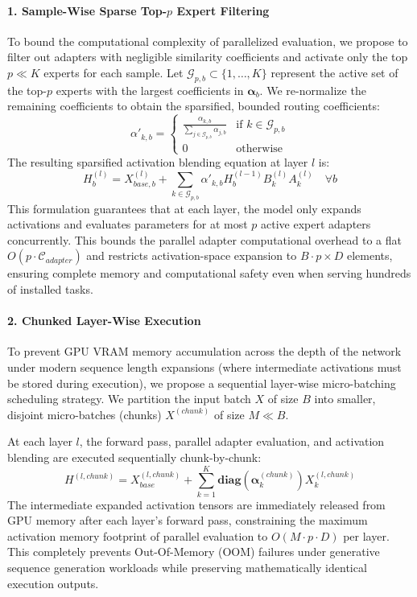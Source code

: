 \paragraph{1. Sample-Wise Sparse Top-$p$ Expert Filtering}
To bound the computational complexity of parallelized evaluation, we propose to filter out adapters with negligible similarity coefficients and activate only the top $p \ll K$ experts for each sample. Let $\mathcal{G}_{p, b} \subset \{1, \dots, K\}$ represent the active set of the top-$p$ experts with the largest coefficients in $\boldsymbol{\alpha}_b$. We re-normalize the remaining coefficients to obtain the sparsified, bounded routing coefficients:
\begin{equation}
  \alpha'_{k, b} = \begin{cases} 
    \frac{\alpha_{k, b}}{\sum_{j \in \mathcal{G}_{p, b}} \alpha_{j, b}} & \text{if } k \in \mathcal{G}_{p, b} \\
    0 & \text{otherwise}
  \end{cases}
\end{equation}
The resulting sparsified activation blending equation at layer $l$ is:
\begin{equation}
  H_b^{(l)} = X_{base, b}^{(l)} + \sum_{k \in \mathcal{G}_{p, b}} \alpha'_{k, b} H_b^{(l-1)} B_k^{(l)} A_k^{(l)} \quad \forall b
\end{equation}
This formulation guarantees that at each layer, the model only expands activations and evaluates parameters for at most $p$ active expert adapters concurrently. This bounds the parallel adapter computational overhead to a flat $O(p \cdot \mathcal{C}_{adapter})$ and restricts activation-space expansion to $B \cdot p \times D$ elements, ensuring complete memory and computational safety even when serving hundreds of installed tasks.

\paragraph{2. Chunked Layer-Wise Execution}
To prevent GPU VRAM memory accumulation across the depth of the network under modern sequence length expansions (where intermediate activations must be stored during execution), we propose a sequential layer-wise micro-batching scheduling strategy. We partition the input batch $X$ of size $B$ into smaller, disjoint micro-batches (chunks) $X^{(chunk)}$ of size $M \ll B$. 

At each layer $l$, the forward pass, parallel adapter evaluation, and activation blending are executed sequentially chunk-by-chunk:
\begin{equation}
  H^{(l, chunk)} = X^{(l, chunk)}_{base} + \sum_{k=1}^K \mathbf{diag}(\boldsymbol{\alpha}_k^{(chunk)}) X_k^{(l, chunk)}
\end{equation}
The intermediate expanded activation tensors are immediately released from GPU memory after each layer's forward pass, constraining the maximum activation memory footprint of parallel evaluation to $O(M \cdot p \cdot D)$ per layer. This completely prevents Out-Of-Memory (OOM) failures under generative sequence generation workloads while preserving mathematically identical execution outputs.

